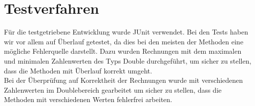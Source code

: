 \documentclass[a4paper,11pt]{scrartcl}
\begin{document}
\section{Testverfahren}
Für die testgetriebene Entwicklung wurde JUnit verwendet. Bei den Tests haben wir vor allem auf Überlauf getestet, da dies bei den meisten der Methoden eine mögliche Fehlerquelle darstellt. Dazu wurden Rechnungen mit dem maximalen und minimalen Zahlenwerten des Typs Double durchgeführt, um sicher zu stellen, dass die Methoden mit Überlauf korrekt umgeht. 
\\
Bei der Überprüfung auf Korrektheit der Rechnungen wurde mit verschiedenen Zahlenwerten im Doublebereich gearbeitet um sicher zu stellen, dass die Methoden mit verschiedenen Werten fehlerfrei arbeiten. 
\end{document}
